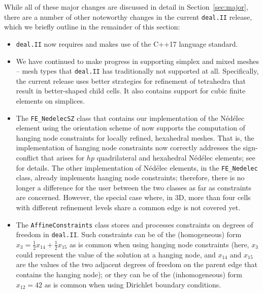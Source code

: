 \documentclass{ansarticle-preprint}
\newcommand{\specialword}[1]{\texttt{#1}}
\newcommand{\dealii}{{\specialword{deal.II}}\xspace}
\begin{document}
While all of these major changes are discussed in detail in
Section~\ref{sec:major}, there
are a number of other noteworthy changes in the current \dealii release,
which we briefly outline in the remainder of this section:
%
\begin{itemize}
  \item \dealii{} now requires and makes use of the C++17 language standard.
  \item We have continued to make progress in supporting simplex and
    mixed meshes -- mesh types that \dealii{} has traditionally not
    supported at all. Specifically, the current release uses
    better strategies for refinement of tetrahedra that result in
    better-shaped child cells. It also contains
    support for cubic finite elements on simplices.
   \item The \texttt{FE\_NedelecSZ} class that contains our 
    implementation of the N\'ed\'elec element using the orientation 
    scheme of \cite{Zag06} now supports the computation of hanging 
    node constraints for locally refined, hexahedral meshes. 
    That is, the implementation of hanging node constraints now
    correctly addresses the sign-conflict that arises for $hp$ quadrilateral and 
    hexahedral N\'ed\'elec elements; 
    see \cite{Kinnewig2024} for details. 
    The other implementation of N\'ed\'elec elements, in the \texttt{FE\_Nedelec} class, already
    implements hanging node constraints; therefore, there is no longer
    a difference for the user between the two classes as far as
    constraints are concerned. 
    However, the special case where, in 3D, more than four cells with 
    different refinement levels share a common edge is not covered yet.
  \item The \texttt{AffineConstraints} class stores and processes
    constraints on degrees of freedom in \dealii{}. Such constraints
    can be of the (homogeneous) form $x_3 = \frac 12 x_{14} + \frac 12 x_{15}$ as is
    common when using hanging node constraints (here, $x_3$ could
    represent the value of the solution at a hanging node, and $x_{14}$
    and $x_{15}$ are the values of the two adjacent degrees of freedom on
    the parent edge that contains the hanging node); or they can be of
    the (inhomogeneous) form $x_{12}=42$ as is common when using Dirichlet boundary
    conditions.


\end{itemize}
\end{document}
